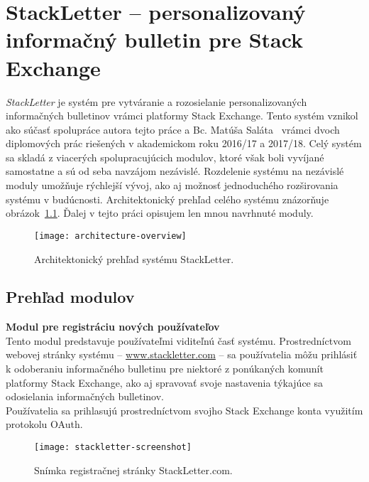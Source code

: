 \newpage
\chapter{StackLetter -- personalizovaný informačný bulletin pre Stack Exchange}

\textit{StackLetter} je systém pre vytváranie a rozosielanie personalizovaných informačných bulletinov vrámci platformy
Stack Exchange. Tento systém vznikol ako súčasť spolupráce autora tejto práce a Bc. Matúša Saláta~\cite{Salat2018} vrámci
dvoch diplomových prác riešených v akademickom roku 2016/17 a 2017/18. Celý systém sa skladá
z viacerých spolupracujúcich modulov, ktoré však boli vyvíjané samostatne a sú od seba navzájom nezávislé. Rozdelenie
systému na nezávislé moduly umožňuje rýchlejší vývoj, ako aj možnosť jednoduchého rozširovania systému v budúcnosti.
Architektonický prehľad celého systému znázorňuje obrázok~\ref{fig:architecutre-overview}. Ďalej v tejto práci opisujem
len mnou navrhnuté moduly.

\begin{figure}[H]\begin{center}
\texttt{[image: architecture-overview]}
\caption{Architektonický prehľad systému StackLetter. \label{fig:architecutre-overview}}\end{center}
\end{figure}

\section{Prehľad modulov}

\textbf{Modul pre registráciu nových používateľov}\\
Tento modul predstavuje používateľmi viditeľnú časť systému. Prostredníctvom webovej stránky systému
-- \url{www.stackletter.com} -- sa používatelia môžu prihlásiť k odoberaniu informačného bulletinu pre niektoré
z ponúkaných komunít platformy Stack Exchange, ako aj spravovať svoje nastavenia týkajúce sa odosielania informačných
bulletinov.\\
Používatelia sa prihlasujú prostredníctvom svojho Stack Exchange konta využitím protokolu OAuth.

\begin{figure}[H]\begin{center}
\texttt{[image: stackletter-screenshot]}
\caption{Snímka registračnej stránky StackLetter.com. \label{fig:stackletter.com}}\end{center}
\end{figure}

